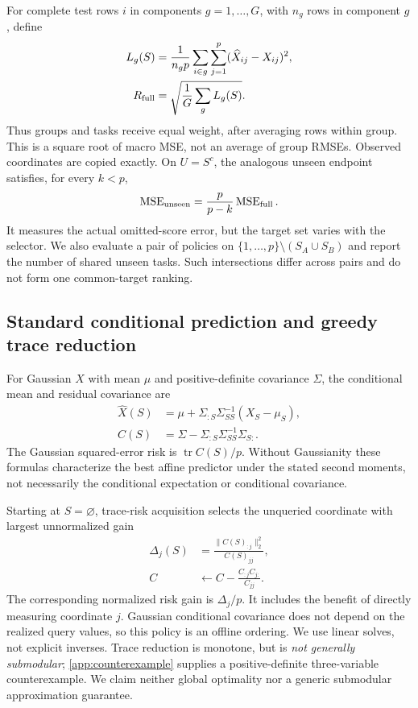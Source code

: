 \documentclass{article}
\newcommand{\tr}{\operatorname{tr}}
\newcommand{\MSE}{\operatorname{MSE}}
\begin{document}
For complete test rows $i$ in components $g=1,\ldots,G$, with $n_g$ rows in component $g$, define
\begin{align}
 L_g(S)&=\frac{1}{n_gp}\sum_{i\in g}\sum_{j=1}^p(\widehat X_{ij}-X_{ij})^2,\label{eq:metric}\\
 R_{\rm full}&=\sqrt{\frac1G\sum_g L_g(S)}.\nonumber
\end{align}
Thus groups and tasks receive equal weight, after averaging rows within group. This is a square root of macro MSE, not an average of group RMSEs. Observed coordinates are copied exactly. On $U=S^c$, the analogous unseen endpoint satisfies, for every $k<p$,
\begin{equation}
 \MSE_{\rm unseen}=\frac{p}{p-k}\MSE_{\rm full}.
 \label{eq:unseen}
\end{equation}
It measures the actual omitted-score error, but the target set varies with the selector. We also evaluate a pair of policies on $\{1,\ldots,p\}\setminus(S_A\cup S_B)$ and report the number of shared unseen tasks. Such intersections differ across pairs and do not form one common-target ranking.

\subsection{Standard conditional prediction and greedy trace reduction}
For Gaussian $X$ with mean $\mu$ and positive-definite covariance $\Sigma$, the conditional mean and residual covariance are
\begin{align}
 \widehat X(S)&=\mu+\Sigma_{:S}\Sigma_{SS}^{-1}(X_S-\mu_S),\label{eq:predict}\\
 C(S)&=\Sigma-\Sigma_{:S}\Sigma_{SS}^{-1}\Sigma_{S:}.\label{eq:conditional}
\end{align}
The Gaussian squared-error risk is $\tr C(S)/p$. Without Gaussianity these formulas characterize the best affine predictor under the stated second moments, not necessarily the conditional expectation or conditional covariance.

Starting at $S=\varnothing$, trace-risk acquisition selects the unqueried coordinate with largest unnormalized gain
\begin{align}
 \Delta_j(S)&=\frac{\|C(S)_{:j}\|_2^2}{C(S)_{jj}},\label{eq:gain}\\
 C&\leftarrow C-\frac{C_{:j}C_{j:}}{C_{jj}}.\nonumber
\end{align}
The corresponding normalized risk gain is $\Delta_j/p$. It includes the benefit of directly measuring coordinate $j$. Gaussian conditional covariance does not depend on the realized query values, so this policy is an offline ordering. We use linear solves, not explicit inverses. Trace reduction is monotone, but is \emph{not generally submodular}; \cref{app:counterexample} supplies a positive-definite three-variable counterexample. We claim neither global optimality nor a generic submodular approximation guarantee.
\end{document}
